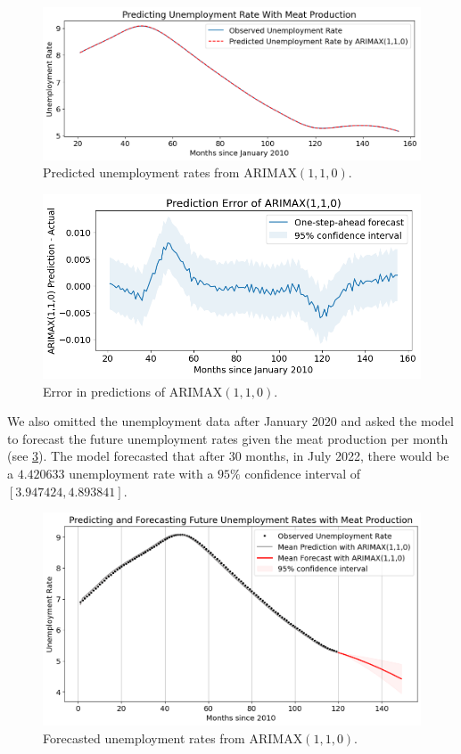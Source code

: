 \documentclass[12pt]{article}
\begin{document}
\begin{figure}[H]
    \centering
    \includegraphics[width=0.6\linewidth]{images/ARIMAX Prediction.png}
    \caption{Predicted unemployment rates from $\mathrm{ARIMAX}(1,1,0)$.}
    \label{fig:arimax-predict}
\end{figure}

\begin{figure}[H]
    \centering
    \includegraphics[width=0.6\linewidth]{images/ARIMAX Error.png}
    \caption{Error in predictions of $\mathrm{ARIMAX}(1,1,0)$.}
    \label{fig:arimax-error}
\end{figure}

We also omitted the unemployment data after January 2020 and asked the model to forecast the future unemployment rates given the meat production per month (see \ref{fig:arimax-forecast}). The model forecasted that after 30 months, in July 2022, there would be a $4.420633$ unemployment rate with a $95\%$ confidence interval of $[3.947424, 4.893841]$. 

\begin{figure}[H]
    \centering
    \includegraphics[width=0.6\linewidth]{images/ARIMAX Forecasting.png}
    \caption{Forecasted unemployment rates from $\mathrm{ARIMAX}(1,1,0)$.}
    \label{fig:arimax-forecast}
\end{figure}
\end{document}
